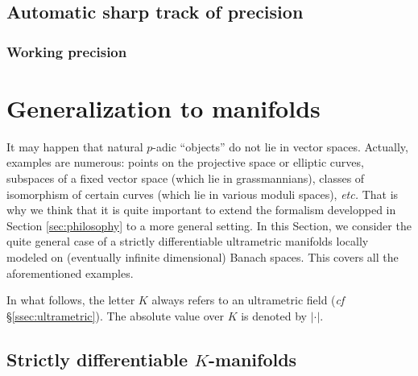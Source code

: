 \documentclass{amsart}
\begin{document}
\subsection{Automatic sharp track of precision}


\subsubsection*{Working precision}

\section{Generalization to manifolds}

It may happen that natural $p$-adic ``objects'' do not lie in vector 
spaces. Actually, examples are numerous: points on the projective space 
or elliptic curves, subspaces of a fixed vector space (which lie in 
grassmannians), classes of isomorphism of certain curves (which lie in 
various moduli spaces), \emph{etc.} 
That is why we think that it is quite important to extend the formalism 
developped in Section \ref{sec:philosophy} to a more general setting. 
In this Section, we consider the quite general case of a strictly
differentiable ultrametric manifolds locally modeled on (eventually 
infinite dimensional) Banach spaces. This covers all the aforementioned 
examples.

In what follows, the letter $K$ always refers to an ultrametric field 
(\emph{cf} \S \ref{ssec:ultrametric}). The absolute value over $K$ is 
denoted by $|\cdot|$.

\subsection{Strictly differentiable $K$-manifolds}
\label{ssec:manifold}
\end{document}

